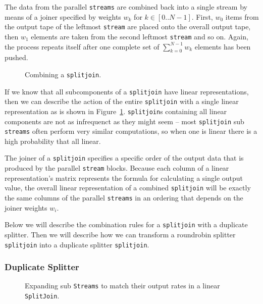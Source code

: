The data from the parallel {\tt streams} are combined back into a single stream by means of
a joiner specified by weights $w_k$ for $k\in[0..N-1]$. First, $w_0$ items from the output tape of the 
leftmost {\tt stream} are placed onto the overall output tape, then 
$w_1$ elements are taken from the second leftmost {\tt stream} and so on. 
Again, the process repeats itself after one complete set of $\sum_{k=0}^{N-1} w_k$ 
elements has been pushed.

\begin{figure}
\center
\epsfxsize=3.0in
\caption{Combining a {\tt splitjoin}.}
\label{fig:splitjoin-combine}
\vspace{-12pt}
\end{figure}

If we know that all subcomponents of a {\tt splitjoin} 
have linear representations, then we can describe the action of the entire {\tt splitjoin} 
with a single linear representation as is shown in Figure~\ref{fig:splitjoin-combine}.
{\tt splitjoin}s containing all linear components are not as infrequenct as they might seem -- 
most {\tt splitjoin} sub {\tt streams} often perform very similar computations, so when one 
is linear there is a high probability that all linear.

The joiner of a {\tt splitjoin} specifies a specific order of the output data 
that is produced by the parallel {\tt stream} blocks. Because each column 
of a linear representation's matrix represents the formula for calculating a single output value, 
the overall linear representation of a combined {\tt splitjoin} will be exactly 
the same columns of the parallel {\tt streams} in an ordering that depends on the joiner weights $w_i$.

Below we will describe the combination rules for a {\tt splitjoin}
with a duplicate splitter. Then we will describe how we can transform 
a roundrobin splitter {\tt splitjoin} into a duplicate splitter {\tt splitjoin}. 


\subsubsection{Duplicate Splitter}

\begin{figure}
\center
\epsfxsize=3.0in
\caption{Expanding sub {\tt Streams} to match their output rates in a linear {\tt SplitJoin}.}
\label{fig:splitjoin-duplicate-ratematch}
\end{figure}

